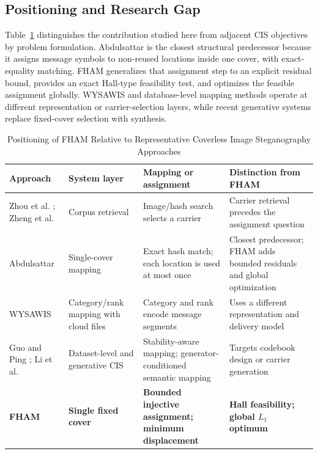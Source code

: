\documentclass[preprint,12pt]{elsarticle}
\theoremstyle{plain}
\begin{document}
\subsection{Positioning and Research Gap}
Table~\ref{tab:positioning} distinguishes the contribution studied here from adjacent CIS objectives by problem formulation. Abdulsattar is the closest structural predecessor because it assigns message symbols to non-reused locations inside one cover, with exact-equality matching. FHAM generalizes that assignment step to an explicit residual bound, provides an exact Hall-type feasibility test, and optimizes the feasible assignment globally. WYSAWIS and database-level mapping methods operate at different representation or carrier-selection layers, while recent generative systems replace fixed-cover selection with synthesis.

\begin{table}[!t]
\centering
\caption{Positioning of FHAM Relative to Representative Coverless Image Steganography Approaches}
\label{tab:positioning}
\begin{tabular}{@{}>{\raggedright\arraybackslash}p{}>{\raggedright\arraybackslash}p{}>{\raggedright\arraybackslash}p{}>{\raggedright\arraybackslash}p{}@{}}
\toprule
\textbf{Approach} & \textbf{System layer} & \textbf{Mapping or assignment} & \textbf{Distinction from FHAM} \\
\midrule
Zhou et al. \cite{zhou2015coverless}; Zheng et al. \cite{zheng2018coverless} & Corpus retrieval & Image/hash search selects a carrier & Carrier retrieval precedes the assignment question \\
Abdulsattar \cite{abdulsattar2021} & Single-cover mapping & Exact hash match; each location is used at most once & Closest predecessor; FHAM adds bounded residuals and global optimization \\
WYSAWIS \cite{wysawis2024} & Category/rank mapping with cloud files & Category and rank encode message segments & Uses a different representation and delivery model \\
Guo and Ping \cite{guo2026capacity}; Li et al. \cite{li2026mllm} & Dataset-level and generative CIS & Stability-aware mapping; generator-conditioned semantic mapping & Targets codebook design or carrier generation \\
\textbf{FHAM} & \textbf{Single fixed cover} & \textbf{Bounded injective assignment; minimum displacement} & \textbf{Hall feasibility; global $L_1$ optimum} \\
\bottomrule
\end{tabular}%
\end{table}
\end{document}
